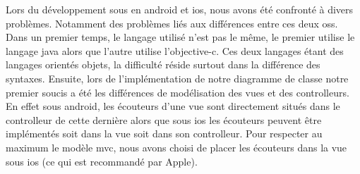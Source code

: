 Lors du développement sous en \gls{android} et \gls{ios}, nous avons été confronté à divers problèmes. Notamment des problèmes liés aux différences entre ces deux \glspl{os}. Dans un premier temps, le langage utilisé n'est pas le même, le premier utilise le langage \gls{java} alors que l'autre utilise l'\gls{objective-c}. Ces deux langages étant des langages orientés objets, la difficulté réside surtout dans la différence des syntaxes.
Ensuite, lors de l'implémentation de notre diagramme de classe notre premier soucis a été les différences de modélisation des vues et des controlleurs. En effet sous \gls{android}, les écouteurs d'une vue sont directement situés dans le controlleur de cette dernière alors que sous \gls{ios} les écouteurs peuvent être implémentés soit dans la vue soit dans son controlleur. Pour respecter au maximum le modèle \gls{mvc}, nous avons choisi de placer les écouteurs dans la vue sous \gls{ios} (ce qui est recommandé par Apple). 